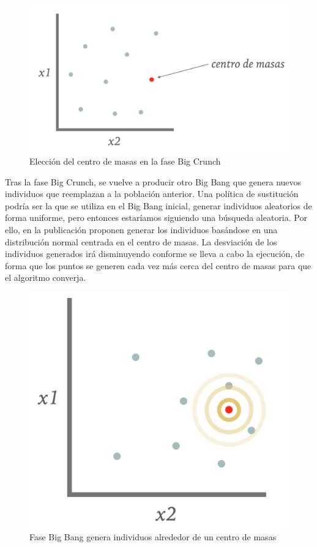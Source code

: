 \begin{figure}[H]
\centering
    \includegraphics[scale=0.28]{img/big_crunch.png}
    \caption{Elección del centro de masas en la fase Big Crunch}
\end{figure}

Tras la fase Big Crunch, se vuelve a producir otro Big Bang que genera nuevos individuos que reemplazan a la población anterior. Una política de sustitución podría ser la que se utiliza en el Big Bang inicial, generar individuos aleatorios de forma uniforme, pero entonces estaríamos siguiendo una búsqueda aleatoria. Por ello, en la publicación proponen generar los individuos basándose en una distribución normal centrada en el centro de masas. La desviación de los individuos generados irá disminuyendo conforme se lleva a cabo la ejecución, de forma que los puntos se generen cada vez más cerca del centro de masas para que el algoritmo converja. 

\begin{figure}[H]
    \centering
        \includegraphics[scale=0.28]{img/big_bang.png}
        \caption{Fase Big Bang genera individuos alrededor de un centro de masas}
    \end{figure}

